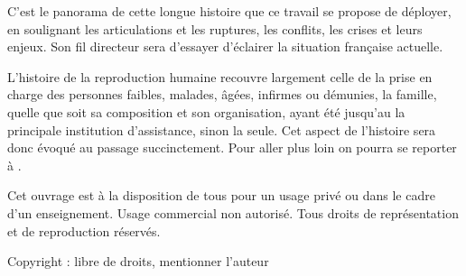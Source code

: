 C'est le panorama de cette longue histoire que ce travail se propose de déployer, en soulignant les articulations et les ruptures, les
conflits, les crises et leurs enjeux. Son fil directeur sera d'essayer d'éclairer la situation française actuelle.

L'histoire de la reproduction humaine recouvre largement celle
de la prise en charge des personnes faibles, malades, âgées, infirmes ou
démunies, la famille, quelle que soit sa composition et son organisation, ayant été jusqu'au  la principale institution
d'assistance, sinon la seule. Cet aspect de l'histoire sera donc évoqué
au passage succinctement. Pour aller plus loin on
pourra se reporter à \cite{tigreat2010}.

Cet ouvrage est à la disposition de tous pour un usage privé ou dans le cadre d'un enseignement. Usage commercial non autorisé. Tous droits de représentation et de reproduction réservés.

Copyright : libre de droits, mentionner l'auteur


